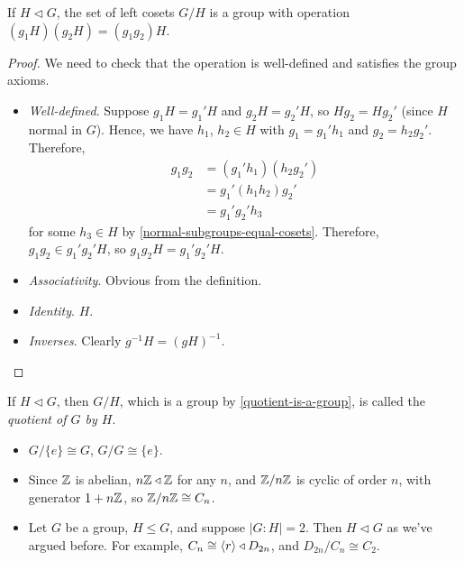 \documentclass{../template/note}
\begin{document}
    \begin{theorem}
        If \(H \triangleleft G\), the set of left cosets \(G/H\) is a group with operation \((g_1H)(g_2H) = (g_1g_2)H\).
        \label{quotient-is-a-group}
    \end{theorem}
    
    \begin{proof}
        We need to check that the operation is well-defined and satisfies the group axioms.
        \begin{itemize}
            \item \emph{Well-defined}. Suppose \(g_1H = g_1'H\) and \(g_2H = g_2'H\), so \(Hg_2 = Hg_2'\) (since \(H\) normal in \(G\)). Hence, we have \(h_1\), \(h_2 \in H\) with \(g_1 = g_1'h_1\) and \(g_2 = h_2g_2'\). Therefore,
            \begin{align*}
                g_1g_2 &= (g_1'h_1)(h_2g_2') \\
                &= g_1'(h_1h_2)g_2' \\
                &= g_1'g_2'h_3
            \end{align*}
            for some \(h_3 \in H\) by \cref{normal-subgroups-equal-cosets}. Therefore, \(g_1g_2 \in g_1'g_2'H\), so \(g_1g_2H = g_1'g_2'H\).
            \item \emph{Associativity}. Obvious from the definition.
            \item \emph{Identity}. \(H\).
            \item \emph{Inverses}. Clearly \(g^{-1}H = (gH)^{-1}\).
        \end{itemize}
    \end{proof}
    
    \begin{definition}
        If \(H \triangleleft G\), then \(G/H\), which is a group by \cref{quotient-is-a-group}, is called the \emph{quotient of \(G\) by \(H\)}.
    \end{definition}
    
    \begin{example}
        \begin{itemize}
            \item \(G/\{e\} \cong G\), \(G/G \cong \{e\}\).
            \item Since \(\mathbb Z\) is abelian, \(n\mathbb Z \triangleleft \mathbb Z\) for any \(n\), and \(\mathbb Z/n\mathbb Z\) is cyclic of order \(n\), with generator \(1 + n\mathbb Z\), so \(\mathbb Z/n\mathbb Z \cong C_n\).
            \item Let \(G\) be a group, \(H \leq G\), and suppose \(|G:H| = 2\). Then \(H \triangleleft G\) as we've argued before. For example, \(C_n \cong \left \langle r \right \rangle \triangleleft D_{2n}\), and \(D_{2n} / C_n \cong C_2\).
        \end{itemize}
    \end{example}
    
\end{document}
